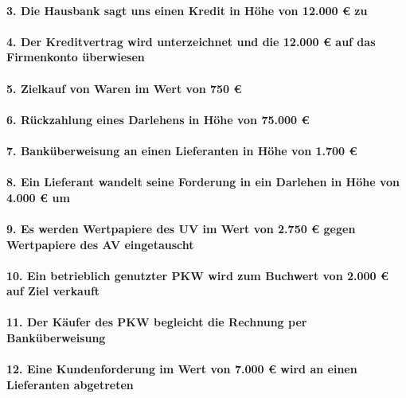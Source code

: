 \documentclass[paper=a4, fontsize=11pt]{scrartcl}
\numberwithin{equation}{section}
\numberwithin{figure}{section}
\numberwithin{table}{section}
\begin{document}
\paragraph{3. Die Hausbank sagt uns einen Kredit in Höhe von 12.000 € zu}

\paragraph{4. Der Kreditvertrag wird unterzeichnet und die 12.000 € auf das Firmenkonto überwiesen}

\paragraph{5. Zielkauf von Waren im Wert von 750 €}

\paragraph{6. Rückzahlung eines Darlehens in Höhe von 75.000 €}

\paragraph{7. Banküberweisung an einen Lieferanten in Höhe von 1.700 €}

\paragraph{8. Ein Lieferant wandelt seine Forderung in ein Darlehen in Höhe von 4.000 € um}

\paragraph{9. Es werden Wertpapiere des UV im Wert von 2.750 € gegen Wertpapiere des AV eingetauscht}

\paragraph{10. Ein betrieblich genutzter PKW wird zum Buchwert von 2.000 € auf Ziel verkauft}

\paragraph{11. Der Käufer des PKW begleicht die Rechnung per Banküberweisung}

\paragraph{12. Eine Kundenforderung im Wert von 7.000 € wird an einen Lieferanten abgetreten}
\end{document}
